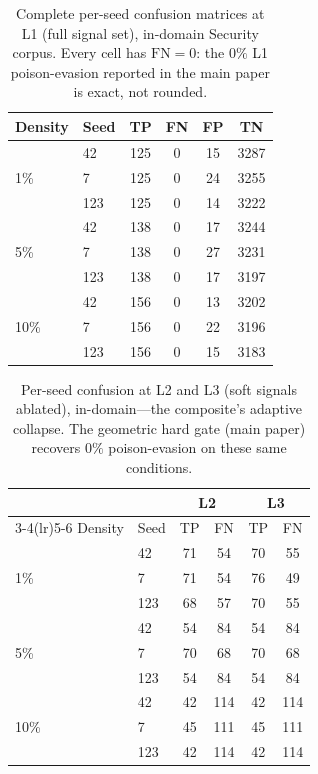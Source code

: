 \documentclass[conference]{IEEEtran}
\begin{document}
\begin{table}[htbp]
\centering
\caption{Complete per-seed confusion matrices at L1 (full signal set), in-domain
Security corpus. Every cell has $\mathrm{FN}=0$: the $0\%$ L1 poison-evasion reported
in the main paper is exact, not rounded.}
\label{tab:confL1}
\begin{tabular}{llcccc}
\toprule
Density & Seed & TP & FN & FP & TN \\
\midrule
\multirow{3}{*}{1\%}  & 42  & 125 & 0 & 15 & 3287 \\
                      & 7   & 125 & 0 & 24 & 3255 \\
                      & 123 & 125 & 0 & 14 & 3222 \\
\midrule
\multirow{3}{*}{5\%}  & 42  & 138 & 0 & 17 & 3244 \\
                      & 7   & 138 & 0 & 27 & 3231 \\
                      & 123 & 138 & 0 & 17 & 3197 \\
\midrule
\multirow{3}{*}{10\%} & 42  & 156 & 0 & 13 & 3202 \\
                      & 7   & 156 & 0 & 22 & 3196 \\
                      & 123 & 156 & 0 & 15 & 3183 \\
\bottomrule
\end{tabular}
\end{table}

\begin{table}[htbp]
\centering
\caption{Per-seed confusion at L2 and L3 (soft signals ablated), in-domain---the
composite's adaptive collapse. The geometric hard gate (main paper)
recovers $0\%$ poison-evasion on these same conditions.}
\label{tab:confL23}
\begin{tabular}{llcccc}
\toprule
 & & \multicolumn{2}{c}{L2} & \multicolumn{2}{c}{L3} \\
\cmidrule(lr){3-4}\cmidrule(lr){5-6}
Density & Seed & TP & FN & TP & FN \\
\midrule
\multirow{3}{*}{1\%}  & 42  & 71 & 54  & 70 & 55  \\
                      & 7   & 71 & 54  & 76 & 49  \\
                      & 123 & 68 & 57  & 70 & 55  \\
\midrule
\multirow{3}{*}{5\%}  & 42  & 54 & 84  & 54 & 84  \\
                      & 7   & 70 & 68  & 70 & 68  \\
                      & 123 & 54 & 84  & 54 & 84  \\
\midrule
\multirow{3}{*}{10\%} & 42  & 42 & 114 & 42 & 114 \\
                      & 7   & 45 & 111 & 45 & 111 \\
                      & 123 & 42 & 114 & 42 & 114 \\
\bottomrule
\end{tabular}
\end{table}
\end{document}
